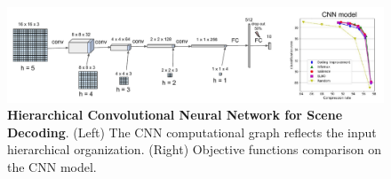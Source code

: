 \documentclass{article}
\begin{document}


\begin{figure}[b]
		\vspace{-1cm}
	\centerline{
		\includegraphics[width = \linewidth]{img/NIPS-convolutional.pdf} 
	}
	\vspace{-.2cm}
	\caption{\textbf{Hierarchical Convolutional Neural Network for Scene Decoding}. (Left) The CNN computational graph reflects the input hierarchical organization. (Right) Objective functions comparison on the CNN model.}\label{fig:CNN}
	\vspace{-.5cm}
\end{figure}
\end{document}
